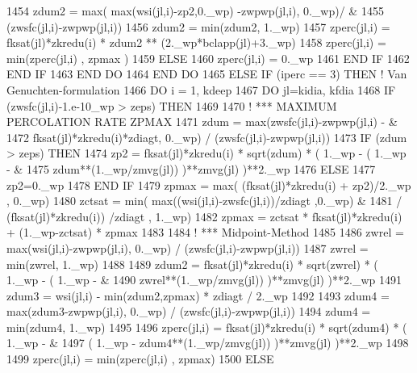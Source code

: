 \begin{DoxyCode}
1454             zdum2 = max( max(wsi(jl,i)-zp2,0.\_wp)  -zwpwp(jl,i), 0.\_wp)/  &
1455                 (zwsfc(jl,i)-zwpwp(jl,i))
1456             zdum2 = min(zdum2, 1.\_wp)
1457             zperc(jl,i) = fksat(jl)*zkredu(i) * zdum2 ** (2.\_wp*bclapp(jl)+3.\_wp)
1458             zperc(jl,i) = min(zperc(jl,i) , zpmax )
1459           \textcolor{keywordflow}{ELSE}
1460             zperc(jl,i) = 0.\_wp
1461 \textcolor{keywordflow}{          END IF}
1462 \textcolor{keywordflow}{        END IF}
1463 \textcolor{keywordflow}{      END DO}
1464 \textcolor{keywordflow}{    END DO}
1465   \textcolor{keywordflow}{ELSE} \textcolor{keywordflow}{IF} (iperc == 3) \textcolor{keywordflow}{THEN}          \textcolor{comment}{! Van Genuchten-formulation}
1466     \textcolor{keywordflow}{DO} i = 1, kdeep
1467       \textcolor{keywordflow}{DO} jl=kidia, kfdia
1468         \textcolor{keywordflow}{IF} (zwsfc(jl,i)-1.e-10\_wp > zeps) \textcolor{keywordflow}{THEN}
1469 
1470 \textcolor{comment}{!         *** MAXIMUM PERCOLATION RATE ZPMAX}
1471           zdum = max(zwsfc(jl,i)-zwpwp(jl,i) -  &
1472               fksat(jl)*zkredu(i)*zdiagt, 0.\_wp) / (zwsfc(jl,i)-zwpwp(jl,i))
1473           \textcolor{keywordflow}{IF} (zdum > zeps) \textcolor{keywordflow}{THEN}
1474             zp2 = fksat(jl)*zkredu(i) * sqrt(zdum) * ( 1.\_wp - ( 1.\_wp -  &
1475                 zdum**(1.\_wp/zmvg(jl)) )**zmvg(jl) )**2.\_wp
1476           \textcolor{keywordflow}{ELSE}
1477             zp2=0.\_wp
1478 \textcolor{keywordflow}{          END IF}
1479           zpmax = max( (fksat(jl)*zkredu(i) + zp2)/2.\_wp , 0.\_wp)
1480           zctsat = min( max((wsi(jl,i)-zwsfc(jl,i))/zdiagt ,0.\_wp)  &
1481               / (fksat(jl)*zkredu(i)) /zdiagt , 1.\_wp)
1482           zpmax = zctsat * fksat(jl)*zkredu(i) + (1.\_wp-zctsat) * zpmax
1483 
1484 \textcolor{comment}{!         *** Midpoint-Method}
1485 
1486           zwrel = max(wsi(jl,i)-zwpwp(jl,i), 0.\_wp) / (zwsfc(jl,i)-zwpwp(jl,i))
1487           zwrel = min(zwrel, 1.\_wp)
1488 
1489           zdum2 = fksat(jl)*zkredu(i) * sqrt(zwrel) * ( 1.\_wp - ( 1.\_wp -  &
1490               zwrel**(1.\_wp/zmvg(jl)) )**zmvg(jl) )**2.\_wp
1491           zdum3 = wsi(jl,i) - min(zdum2,zpmax) * zdiagt / 2.\_wp
1492 
1493           zdum4 = max(zdum3-zwpwp(jl,i), 0.\_wp) / (zwsfc(jl,i)-zwpwp(jl,i))
1494           zdum4 = min(zdum4, 1.\_wp)
1495 
1496           zperc(jl,i) = fksat(jl)*zkredu(i) * sqrt(zdum4) * ( 1.\_wp -  &
1497               ( 1.\_wp - zdum4**(1.\_wp/zmvg(jl)) )**zmvg(jl) )**2.\_wp
1498 
1499           zperc(jl,i) = min(zperc(jl,i) , zpmax)
1500         \textcolor{keywordflow}{ELSE}

\end{DoxyCode}
